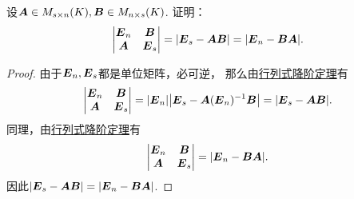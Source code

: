 \begin{example}\label{example:逆矩阵.行列式降阶定理的重要应用1}
设\(\boldsymbol{A} \in M_{s \times n}(K),
\boldsymbol{B} \in M_{n \times s}(K)\).
证明：\[
	\begin{vmatrix}
		\boldsymbol{E}_n & \boldsymbol{B} \\
		\boldsymbol{A} & \boldsymbol{E}_s
	\end{vmatrix}
	= \abs{\boldsymbol{E}_s - \boldsymbol{A} \boldsymbol{B}}
	= \abs{\boldsymbol{E}_n - \boldsymbol{B} \boldsymbol{A}}.
\]
\begin{proof}
由于\(\boldsymbol{E}_n,\boldsymbol{E}_s\)都是单位矩阵，必可逆，
那么由\hyperref[equation:逆矩阵.行列式降阶公式1]{行列式降阶定理}有\begin{equation*}
	\begin{vmatrix}
		\boldsymbol{E}_n & \boldsymbol{B} \\
		\boldsymbol{A} & \boldsymbol{E}_s
	\end{vmatrix}
	= \abs{\boldsymbol{E}_n} \abs{\boldsymbol{E}_s - \boldsymbol{A}(\boldsymbol{E}_n)^{-1}\boldsymbol{B}}
	= \abs{\boldsymbol{E}_s - \boldsymbol{A} \boldsymbol{B}}.
\end{equation*}
同理，由\hyperref[equation:逆矩阵.行列式降阶公式2]{行列式降阶定理}有\begin{equation*}
	\begin{vmatrix}
		\boldsymbol{E}_n & \boldsymbol{B} \\
		\boldsymbol{A} & \boldsymbol{E}_s
	\end{vmatrix}
	= \abs{\boldsymbol{E}_n - \boldsymbol{B} \boldsymbol{A}}.
\end{equation*}
因此\(\abs{\boldsymbol{E}_s - \boldsymbol{A} \boldsymbol{B}} = \abs{\boldsymbol{E}_n - \boldsymbol{B} \boldsymbol{A}}\).
\end{proof}
\end{example}

